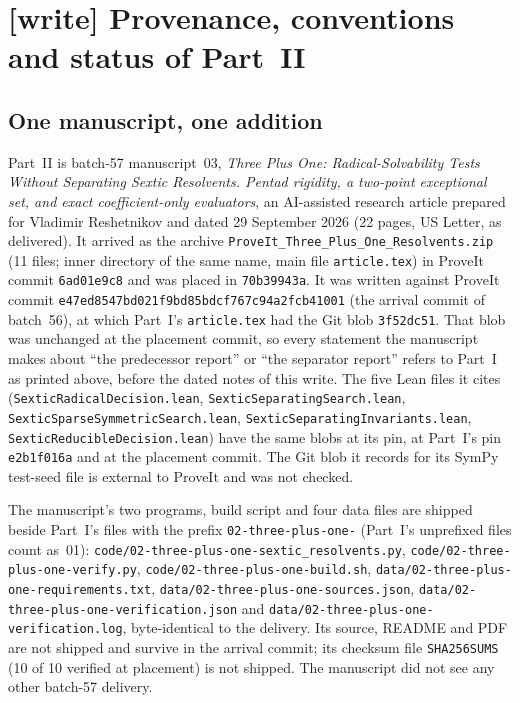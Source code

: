 \documentclass[11pt,letterpaper]{article}
\numberwithin{equation}{section}
\theoremstyle{definition}
\theoremstyle{remark}
\newcommand{\src}[1]{\texttt{\nolinkurl{#1}}}
\newcommand{\tpopin}{\texttt{e47ed8547bd021f9bd85bdcf767c94a2fcb41001}}
\begin{document}
\section{[write] Provenance, conventions and status of Part~II}
\label{tpo:sec:write}

\subsection{One manuscript, one addition}
\label{tpo:sec:provenance}

Part~II is batch-57 manuscript~03, \emph{Three Plus One: Radical-Solvability
Tests Without Separating Sextic Resolvents. Pentad rigidity, a two-point
exceptional set, and exact coefficient-only evaluators}, an AI-assisted
research article prepared for Vladimir Reshetnikov and dated 29 September
2026 (22 pages, US Letter, as delivered). It arrived as the archive
\src{ProveIt_Three_Plus_One_Resolvents.zip} (11 files; inner directory of
the same name, main file \src{article.tex}) in ProveIt commit
\src{6ad01e9c8} and was placed in \src{70b39943a}. It was written against
ProveIt commit \tpopin{} (the arrival commit of batch~56), at which Part~I's
\src{article.tex} had the Git blob \src{3f52dc51}. That blob was unchanged at
the placement commit, so every statement the manuscript makes about ``the
predecessor report'' or ``the separator report'' refers to Part~I as printed
above, before the dated notes of this write. The five Lean files it cites
(\src{SexticRadicalDecision.lean}, \src{SexticSeparatingSearch.lean},
\src{SexticSparseSymmetricSearch.lean}, \src{SexticSeparatingInvariants.lean},
\src{SexticReducibleDecision.lean}) have the same blobs at its pin, at
Part~I's pin \src{e2b1f016a} and at the placement commit. The Git blob it
records for its SymPy test-seed file is external to ProveIt and was not
checked.

The manuscript's two programs, build script and four data files are shipped
beside Part~I's files with the prefix \src{02-three-plus-one-} (Part~I's
unprefixed files count as~01): \src{code/02-three-plus-one-sextic_resolvents.py},
\src{code/02-three-plus-one-verify.py}, \src{code/02-three-plus-one-build.sh},
\src{data/02-three-plus-one-requirements.txt},
\src{data/02-three-plus-one-sources.json},
\src{data/02-three-plus-one-verification.json} and
\src{data/02-three-plus-one-verification.log}, byte-identical to the
delivery. Its source, README and PDF are not shipped and survive in the
arrival commit; its checksum file \src{SHA256SUMS} (10 of 10 verified at
placement) is not shipped. The manuscript did not see any other batch-57
delivery.
\end{document}
